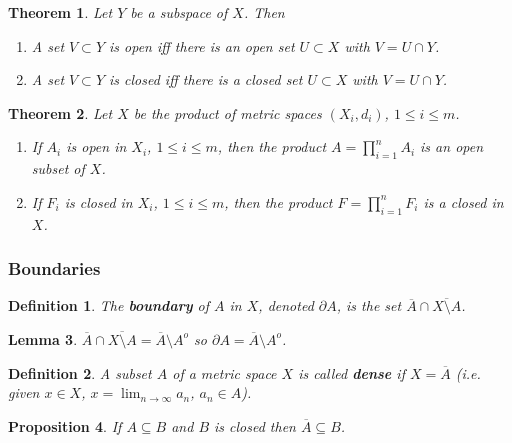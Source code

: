 \documentclass[two column]{article}
\newtheorem{theorem}{Theorem}[subsection]
\newtheorem{lemma}[theorem]{Lemma}
\newtheorem{proposition}[theorem]{Proposition}
\newtheorem{definition}{Definition}[subsection]
\begin{document}
\begin{theorem} Let $Y$ be a subspace of $X$. Then 
\begin{enumerate}
\item A set $V \subset Y$ is open iff there is an open set $U \subset X$ with $V = U \cap Y$. 
\item A set $V \subset Y$ is closed iff there is a closed set $U \subset X$ with $V = U \cap Y$. \\
\end{enumerate}
\end{theorem}

\begin{theorem}
Let $X$ be the product of metric spaces $(X_{i}, d_{i})$, $1 \leq i \leq m$. 
\begin{enumerate}
\item If $A_{i}$ is open in $X_{i}$, $1 \leq i \leq m$, then the product $A = \prod_{i=1}^{n} A_{i}$ is an open subset of $X$.  
\item If $F_{i}$ is closed in $X_{i}$, $1 \leq i \leq m$, then the product $F = \prod_{i=1}^{n} F_{i}$ is a closed in $X$.  
\end{enumerate}
\end{theorem}

\subsubsection{Boundaries}

\begin{definition}
The {\bf boundary} of $A$ in $X$, denoted $\partial A$, is the set $\overline{A} \cap \overline{X \setminus A}$.\\
\end{definition}

\begin{lemma}
$\overline{A} \cap \overline{X \setminus A} = \overline{A} \setminus A^{o}$ so $\partial A = \overline{A} \setminus A^{o}$. \\
\end{lemma}

\begin{definition}
A subset $A$ of a metric space $X$ is called {\bf dense} if $X = \overline{A}$ (i.e. given $x \in X$, $x = \lim_{n \rightarrow \infty} a_{n}$, $a_{n} \in A$). \\
\end{definition}

\begin{proposition}
If $A \subseteq B$ and $B$ is closed then $\overline{A} \subseteq B$. 
\end{proposition}
\end{document}
